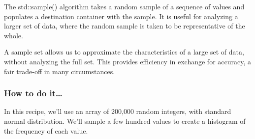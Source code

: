 
The std::sample() algorithm takes a random sample of a sequence of values and populates a destination container with the sample. It is useful for analyzing a larger set of data, where the random sample is taken to be representative of the whole.

A sample set allows us to approximate the characteristics of a large set of data, without analyzing the full set. This provides efficiency in exchange for accuracy, a fair trade-off in many circumstances.

\subsubsection{How to do it…}

In this recipe, we'll use an array of 200,000 random integers, with standard normal distribution. We'll sample a few hundred values to create a histogram of the frequency of each value.

